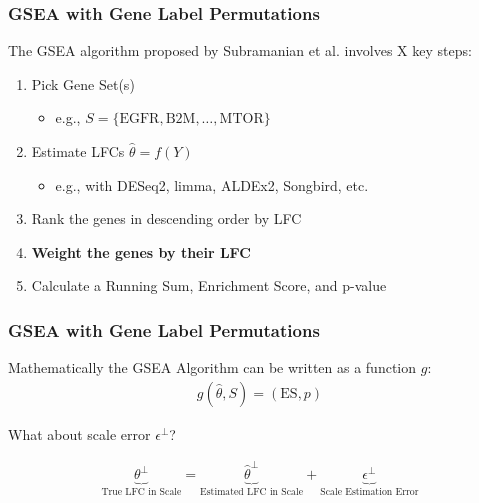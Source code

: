 \documentclass[11pt,t]{beamer}
\begin{document}
\begin{frame}
  \frametitle{GSEA with Gene Label Permutations}

  The GSEA algorithm proposed by Subramanian et al. involves X key steps:
  \begin{enumerate}
    \item Pick Gene Set(s)
      \begin{itemize}
        \item e.g., \(S=\{\text{EGFR}, \text{B2M}, \dots, \text{MTOR}\}\)
      \end{itemize}
    \item Estimate LFCs \(\hat{\theta}=f(Y)\)
      \begin{itemize}
        \item e.g., with DESeq2, limma, ALDEx2, Songbird, etc.
      \end{itemize}
    \item Rank the genes in descending order by LFC
    \item \textbf{Weight the genes by their LFC}
    \item Calculate a Running Sum, Enrichment Score, and p-value
  \end{enumerate}
\end{frame}

\begin{frame}
  \frametitle{GSEA with Gene Label Permutations}

  Mathematically the GSEA Algorithm can be written as a function \(g\):
  \begin{align*}
    g(\hat{\theta}, S) = (\text{ES}, p)
  \end{align*}

  \vspace{5px}

  What about scale error \(\epsilon^\perp\)?

  \vspace{10px}
  \begin{align*}
    \underbrace{\theta^\perp}_{\text{True LFC in Scale}} = \underbrace{\hat{\theta}^\perp}_{\text{Estimated LFC in Scale}} + \underbrace{\epsilon^\perp}_{\text{Scale Estimation Error}}
  \end{align*}
\end{frame}
\end{document}
